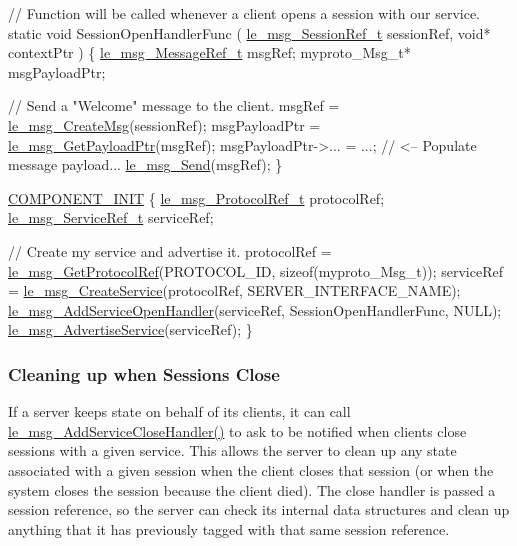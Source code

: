\begin{DoxyCode}
\textcolor{comment}{// Function will be called whenever a client opens a session with our service.}
\textcolor{keyword}{static} \textcolor{keywordtype}{void} SessionOpenHandlerFunc
(
    \hyperlink{le__messaging_8h_aebfc01e15b430a5b4f3038a5bd518904}{le\_msg\_SessionRef\_t}  sessionRef, 
    \textcolor{keywordtype}{void}*                contextPtr  
)
\{
    \hyperlink{le__messaging_8h_a1e5c37fdd50a4d6d24cad82cb166f770}{le\_msg\_MessageRef\_t} msgRef;
    myproto\_Msg\_t* msgPayloadPtr;

    \textcolor{comment}{// Send a "Welcome" message to the client.}
    msgRef = \hyperlink{le__messaging_8h_a8293a69f256b98cbce5b9990ea3520f3}{le\_msg\_CreateMsg}(sessionRef);
    msgPayloadPtr = \hyperlink{le__messaging_8h_a32d1c7ffd913db8546f6f1bd5cce58c4}{le\_msg\_GetPayloadPtr}(msgRef);
    msgPayloadPtr->... = ...; \textcolor{comment}{// <-- Populate message payload...}
    \hyperlink{le__messaging_8h_a073de097d281475c44a445b927fbb929}{le\_msg\_Send}(msgRef);
\}

\hyperlink{le__event_loop_8h_abdb9187a56836a93d19cc793cbd4b7ec}{COMPONENT\_INIT}
\{
    \hyperlink{le__messaging_8h_ac05e9b3268f8fb5776adab6fe11410e5}{le\_msg\_ProtocolRef\_t} protocolRef;
    \hyperlink{le__messaging_8h_ad9f0b13cde1d8c1eab5318dbcf0d9e28}{le\_msg\_ServiceRef\_t} serviceRef;

    \textcolor{comment}{// Create my service and advertise it.}
    protocolRef = \hyperlink{le__messaging_8h_adcd1ff1a6906433aaa6d7038125c4473}{le\_msg\_GetProtocolRef}(PROTOCOL\_ID, \textcolor{keyword}{sizeof}(myproto\_Msg\_t));
    serviceRef = \hyperlink{le__messaging_8h_adbbb2737069b636028128c74ae407742}{le\_msg\_CreateService}(protocolRef, SERVER\_INTERFACE\_NAME);
    \hyperlink{le__messaging_8h_a829d6450d487166e0b2994b4bf44ee5d}{le\_msg\_AddServiceOpenHandler}(serviceRef, SessionOpenHandlerFunc, NULL);
    \hyperlink{le__messaging_8h_ad3ff11d1962840f879d9c8fe7054de0c}{le\_msg\_AdvertiseService}(serviceRef);
\}
\end{DoxyCode}
\hypertarget{c_messaging_c_messagingServerCleanUp}{}\subsubsection{Cleaning up when Sessions Close}\label{c_messaging_c_messagingServerCleanUp}
If a server keeps state on behalf of its clients, it can call \hyperlink{le__messaging_8h_a426dfbae396599d80e52902165368907}{le\+\_\+msg\+\_\+\+Add\+Service\+Close\+Handler()} to ask to be notified when clients close sessions with a given service. This allows the server to clean up any state associated with a given session when the client closes that session (or when the system closes the session because the client died). The close handler is passed a session reference, so the server can check its internal data structures and clean up anything that it has previously tagged with that same session reference.


